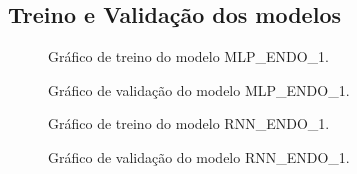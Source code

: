 \documentclass[	12pt, Times, openright, twoside, a4paper, english, brazil]{abntex2}
\begin{document}
    	\subsection{Treino e Validação dos modelos}
    	    \begin{figure}[!ht]
              \caption{Gráfico de treino do modelo MLP\_ENDO\_1. \label{fig:case2_mlp_endo1_train} }
            \end{figure}
            \begin{figure}[!ht]
              \caption{Gráfico de validação do modelo MLP\_ENDO\_1. \label{fig:case2_mlp_endo1_val} }
            \end{figure}
            
    	    \begin{figure}[!ht]
              \caption{Gráfico de treino do modelo RNN\_ENDO\_1. \label{fig:case2_rnn_endo1_train} }
            \end{figure}
            \begin{figure}[!ht]
              \caption{Gráfico de validação do modelo RNN\_ENDO\_1. \label{fig:case2_rnn_endo1_val} }
            \end{figure}
            
\end{document}

